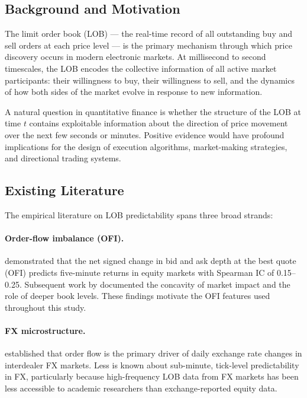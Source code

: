 \documentclass[12pt,a4paper]{article}
\theoremstyle{definition}
\theoremstyle{remark}
\begin{document}
\subsection{Background and Motivation}

The limit order book (LOB) --- the real-time record of all outstanding
buy and sell orders at each price level --- is the primary mechanism
through which price discovery occurs in modern electronic markets.
At millisecond to second timescales, the LOB encodes the collective
information of all active market participants: their willingness to
buy, their willingness to sell, and the dynamics of how both sides
of the market evolve in response to new information.

A natural question in quantitative finance is whether the structure of
the LOB at time $t$ contains exploitable information about the direction
of price movement over the next few seconds or minutes. Positive evidence
would have profound implications for the design of execution algorithms,
market-making strategies, and directional trading systems.

\subsection{Existing Literature}

The empirical literature on LOB predictability spans three broad strands:

\paragraph{Order-flow imbalance (OFI).}
\citet{cont2014price} demonstrated that the net signed change in bid
and ask depth at the best quote (OFI) predicts five-minute returns in
equity markets with Spearman IC of 0.15--0.25. Subsequent work by
\citet{zarinelli2015beyond} documented the concavity of market impact
and the role of deeper book levels. These findings motivate the OFI
features used throughout this study.

\paragraph{FX microstructure.}
\citet{evans2002order} established that order flow is the primary driver
of daily exchange rate changes in interdealer FX markets. Less is known
about sub-minute, tick-level predictability in FX, particularly because
high-frequency LOB data from FX markets has been less accessible to
academic researchers than exchange-reported equity data.
\end{document}
